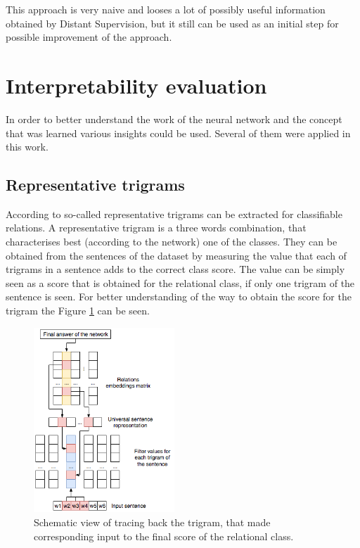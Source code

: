 This approach is very naive and looses a lot of possibly useful information obtained by Distant Supervision,
 but it still can be used as an initial step for possible improvement of the approach.

\section{Interpretability evaluation}
In order to better understand the work of the neural network and the concept that was learned 
various insights could be used. Several of them were applied in this work.

\subsection{Representative trigrams}
\label{subs:repr-trigr}
According to \cite{DBLP:journals/corr/SantosXZ15} so-called representative trigrams can be  
extracted for classifiable relations. A representative trigram is a three words combination, that 
 characterises best (according to the network) one of the classes. They can be obtained from 
 the sentences of the dataset by measuring the value that each of trigrams in a sentence adds to the 
 correct class score. The value can be simply seen as a score that is obtained for the relational class, 
 if only one trigram of the sentence is seen. For better understanding of the way to obtain the 
 score for the trigram the Figure \ref{fig:repr-trigram} can be seen.
 
	\begin{figure}
		\centering
		\includegraphics[width=200px]{chapter3_approach/images/repr-trigram.png}
		\caption[Schema of obtaining a trigram value]{Schematic view of tracing back the trigram, that made corresponding input to the final score of the relational class.}
		\label{fig:repr-trigram}
	\end{figure}

